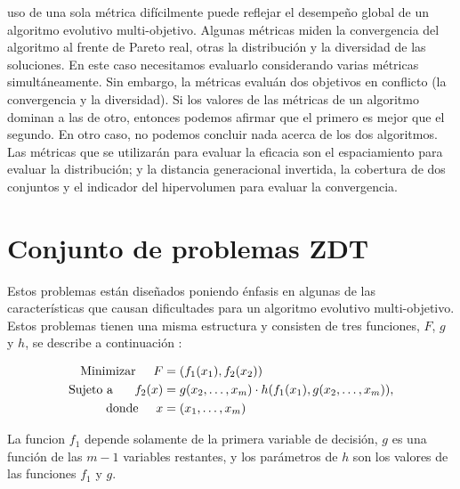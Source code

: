 \DIFaddend uso de una sola m\'etrica dif\'icilmente puede reflejar el desempe\~no global de un algoritmo evolutivo multi-objetivo. Algunas
m\'etricas miden la convergencia del algoritmo al frente de Pareto real, otras la distribuci\'on y la diversidad de las soluciones. 
En este caso necesitamos evaluarlo considerando varias m\'etricas simult\'aneamente. Sin embargo, la m\'etricas evalu\'an dos 
objetivos en conflicto (la convergencia y la diversidad). Si los valores de las m\'etricas de un algoritmo dominan a las de otro,
entonces podemos afirmar que el primero es mejor que el segundo. En otro caso, no podemos concluir nada acerca de los dos algoritmos.
Las m\'etricas que se utilizar\'an para evaluar la eficacia son el espaciamiento para evaluar la distribuci\'on; y la distancia generacional 
invertida, la cobertura de dos conjuntos y el indicador del hipervolumen para evaluar la convergencia. \DIFaddbegin {}\DIFaddend 

\DIFaddbegin \newpage
\DIFaddend \section{Conjunto de problemas ZDT}

Estos problemas est\'an dise\~nados poniendo \'enfasis en algunas de las caracter\'isticas que causan dificultades para un algoritmo 
evolutivo multi-objetivo. Estos problemas tienen una misma estructura y consisten de tres funciones, $F$, $g$ y $h$, se describe a 
continuaci\'on \cite{Zitzler2000}:

\begin{align*}
\text{Minimizar}\hspace{0.5cm} F&=(f_1(x_1),f_2(x_2))\\
\text{Sujeto a }\hspace{0.5cm} f_2(x)&=g(x_2,\ldots,x_m)\cdot h(f_1(x_1),g(x_2,\ldots,x_m)),\\
\text{donde}\hspace{0.5cm} x&= (x_1,\ldots, x_m)
\end{align*}

La funcion $f_1$ depende solamente de la primera variable de decisi\'on, $g$ es una funci\'on de las
$m-1$ variables restantes, y los par\'ametros de $h$ son los valores de las funciones $f_1$ y $g$.

